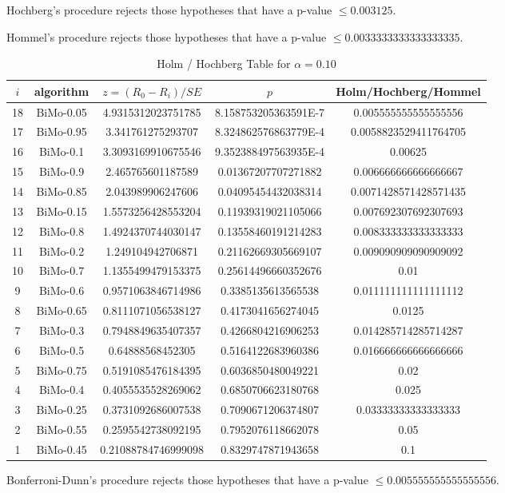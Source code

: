 \documentclass[a4paper,10pt]{article}
\begin{document}
\begin{landscape}
Hochberg's procedure rejects those hypotheses that have a p-value $\le0.003125$.


Hommel's procedure rejects those hypotheses that have a p-value $\le0.0033333333333333335$.


\begin{table}[!htp]
\centering\tiny
\caption{Holm / Hochberg Table for $\alpha=0.10$}
\begin{tabular}{ccccc}
$i$&algorithm&$z=(R_0 - R_i)/SE$&$p$&Holm/Hochberg/Hommel\\
\hline
18&BiMo-0.05&4.9315312023751785&8.158753205363591E-7&0.005555555555555556\\
17&BiMo-0.95&3.341761275293707&8.324862576863779E-4&0.0058823529411764705\\
16&BiMo-0.1&3.3093169910675546&9.352388497563935E-4&0.00625\\
15&BiMo-0.9&2.465765601187589&0.01367207707271882&0.006666666666666667\\
14&BiMo-0.85&2.043989906247606&0.04095454432038314&0.0071428571428571435\\
13&BiMo-0.15&1.5573256428553204&0.11939319021105066&0.007692307692307693\\
12&BiMo-0.8&1.4924370744030147&0.13558460191214283&0.008333333333333333\\
11&BiMo-0.2&1.249104942706871&0.21162669305669107&0.009090909090909092\\
10&BiMo-0.7&1.1355499479153375&0.25614496660352676&0.01\\
9&BiMo-0.6&0.9571063846714986&0.3385135613565538&0.011111111111111112\\
8&BiMo-0.65&0.8111071056538127&0.4173041656274045&0.0125\\
7&BiMo-0.3&0.7948849635407357&0.4266804216906253&0.014285714285714287\\
6&BiMo-0.5&0.64888568452305&0.5164122683960386&0.016666666666666666\\
5&BiMo-0.75&0.5191085476184395&0.6036850480049221&0.02\\
4&BiMo-0.4&0.4055535528269062&0.6850706623180768&0.025\\
3&BiMo-0.25&0.3731092686007538&0.7090671206374807&0.03333333333333333\\
2&BiMo-0.55&0.2595542738092195&0.7952076118662078&0.05\\
1&BiMo-0.45&0.21088784746999098&0.8329747871943658&0.1\\
\hline
\end{tabular}
\end{table}
Bonferroni-Dunn's procedure rejects those hypotheses that have a p-value $\le0.005555555555555556$.



\end{landscape}
\end{document}
